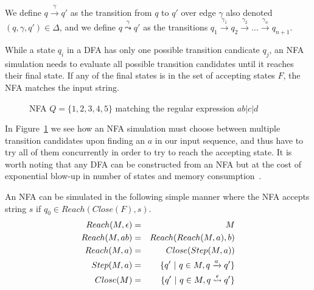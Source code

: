 \documentclass[12pt]{article}
\theoremstyle{definition}
\begin{document}
We define $q \xrightarrow{\gamma} q'$ as the transition from $q$ to $q'$ over edge $\gamma$ also denoted $(q, \gamma, q') \in \Delta$, and we define $q \overset{\gamma}{\leadsto} q'$ as the transitions $q_1 \xrightarrow{\gamma_1} q_{2} \xrightarrow{\gamma_{2}} ... \xrightarrow{\gamma_{n}} q_{n+1}$.

While a state $q_i$ in a DFA has only one possible transition candicate $q_j$, an NFA simulation needs to evaluate all possible transition candidates until it reaches their final state. If any of the final states is in the set of accepting states $F$, the NFA matches the input string.

\begin{figure}[H]
  \begin{center}

	
	\caption{NFA $Q = \{1, 2, 3, 4, 5\}$ matching the regular expression \underline{$ab|c|d$}}
	\label{nfa_simple}
  \end{center}
\end{figure}

In Figure~\ref{nfa_simple} we see how an NFA simulation must choose between multiple transition candidates upon finding an $a$ in our input sequence, and thus have to try all of them concurrently in order to try to reach the accepting state. It is worth noting that any DFA can be constructed from an NFA but at the cost of exponential blow-up in number of states and memory consumption~\cite{nfa-to-dfa}.

An NFA can be simulated in the following simple manner where the NFA accepts string $s$ if $q_0 \in Reach(Close(F), s)$.
\begin{eqnarray}
	Reach(M, \epsilon) & = & M  \notag \\
	Reach(M, ab) & = & Reach(Reach(M, a), b) \notag \\
	Reach(M, a) & = & Close(Step(M, a)) \notag \\
	Step(M, a) & = & \{ q'\ |\ q \in M, q \xrightarrow{a} q' \} \notag \\
	Close(M) & = & \{ q'\ |\ q \in M, q \overset{\epsilon}{\leadsto} q' \} \notag 
\end{eqnarray}
\end{document}
